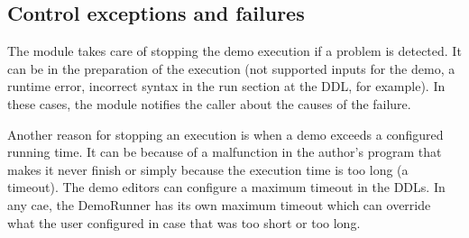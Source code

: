 \subsection{Control exceptions and failures}
\noindent

The module takes care of stopping the demo execution if a problem is detected. It can be in the preparation of the execution (not supported inputs for the demo, a runtime error, incorrect syntax in the run section at the DDL, for example). In these cases, the module notifies the caller about the causes of the failure.

Another reason for stopping an execution is when a demo exceeds a configured running time. It can be because of a malfunction in the author's program that makes it never finish or simply because the execution time is too long (a timeout). The demo editors can configure a maximum timeout in the DDLs. In any cae, the DemoRunner has its own maximum timeout which can override what the user configured in case that was too short or too long.
